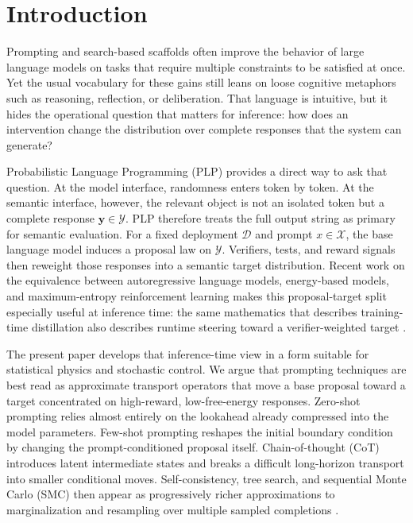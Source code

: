 \documentclass[aps,pre,reprint,superscriptaddress,nofootinbib]{revtex4-2}
\newcommand{\cX}{\mathcal{X}}
\newcommand{\cY}{\mathcal{Y}}
\newcommand{\y}{\mathbf{y}}
\begin{document}
\section{Introduction}

Prompting and search-based scaffolds often improve the behavior of large language models on tasks that require multiple constraints to be satisfied at once. 
Yet the usual vocabulary for these gains still leans on loose cognitive metaphors such as reasoning, reflection, or deliberation.
That language is intuitive, but it hides the operational question that matters for inference: how does an intervention change the distribution over complete responses that the system can generate?

Probabilistic Language Programming (PLP) provides a direct way to ask that question.
At the model interface, randomness enters token by token. At the semantic interface, however, the relevant object is not an isolated token but a complete response $\y \in \cY$.
PLP therefore treats the full output string as primary for semantic evaluation.
For a fixed deployment $\mathcal D$ and prompt $x \in \cX$, the base language model induces a proposal law on $\cY$.
Verifiers, tests, and reward signals then reweight those responses into a semantic target distribution.
Recent work on the equivalence between autoregressive language models, energy-based models, and maximum-entropy reinforcement learning makes this proposal-target split especially useful at inference time: the same mathematics that describes training-time distillation also describes runtime steering toward a verifier-weighted target \cite{blondel2025autoregressive,levine2018reinforcement}.

The present paper develops that inference-time view in a form suitable for statistical physics and stochastic control.
We argue that prompting techniques are best read as approximate transport operators that move a base proposal toward a target concentrated on high-reward, low-free-energy responses.
Zero-shot prompting relies almost entirely on the lookahead already compressed into the model parameters.
Few-shot prompting reshapes the initial boundary condition by changing the prompt-conditioned proposal itself.
Chain-of-thought (CoT) introduces latent intermediate states and breaks a difficult long-horizon transport into smaller conditional moves.
Self-consistency, tree search, and sequential Monte Carlo (SMC) then appear as progressively richer approximations to marginalization and resampling over multiple sampled completions \cite{wang2022self,yao2023tree,zhao2024probabilistic,loula2025syntactic}.
\end{document}
